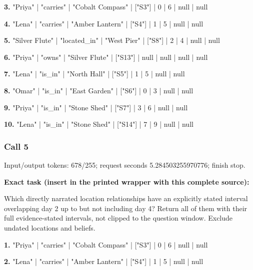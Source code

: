 \noindent\textbf{3.} "Priya" | "carries" | "Cobalt Compass" | ["S3"] | 0 | 6 | null | null\par\smallskip

\noindent\textbf{4.} "Lena" | "carries" | "Amber Lantern" | ["S4"] | 1 | 5 | null | null\par\smallskip

\noindent\textbf{5.} "Silver Flute" | "located\_in" | "West Pier" | ["S8"] | 2 | 4 | null | null\par\smallskip

\noindent\textbf{6.} "Priya" | "owns" | "Silver Flute" | ["S13"] | null | null | null | null\par\smallskip

\noindent\textbf{7.} "Lena" | "is\_in" | "North Hall" | ["S5"] | 1 | 5 | null | null\par\smallskip

\noindent\textbf{8.} "Omar" | "is\_in" | "East Garden" | ["S6"] | 0 | 3 | null | null\par\smallskip

\noindent\textbf{9.} "Priya" | "is\_in" | "Stone Shed" | ["S7"] | 3 | 6 | null | null\par\smallskip

\noindent\textbf{10.} "Lena" | "is\_in" | "Stone Shed" | ["S14"] | 7 | 9 | null | null\par\smallskip

\subsubsection*{Call 5}

Input/output tokens: 678/255; request seconds 5.284503255970776; finish stop.

\noindent\textbf{Exact task (insert in the printed wrapper with this complete source):}\par Which directly narrated location relationships have an explicitly stated interval overlapping day 2 up to but not including day 4? Return all of them with their full evidence-stated intervals, not clipped to the question window. Exclude undated locations and beliefs.

\noindent\textbf{1.} "Priya" | "carries" | "Cobalt Compass" | ["S3"] | 0 | 6 | null | null\par\smallskip

\noindent\textbf{2.} "Lena" | "carries" | "Amber Lantern" | ["S4"] | 1 | 5 | null | null\par\smallskip

